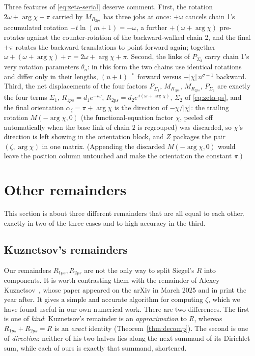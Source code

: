 \documentclass[11pt]{article}
\theoremstyle{definition}
\begin{document}
Three features of \eqref{eq:zeta-serial}
deserve comment. First, the rotation $2\omega+\arg\chi+\pi$ carried by
$M_{R_{2ps}}$ has three jobs at once: $+\omega$ cancels chain 1's
accumulated rotation $-t\ln(m+1)=-\omega$, a
further $+(\omega+\arg\chi)$ pre-rotates against the counter-rotation of
the backward-walked chain 2, and the final $+\pi$ rotates the backward
translations to point forward again; together
$\omega+(\omega+\arg\chi)+\pi=2\omega+\arg\chi+\pi$. Second, the links of
$P_{\Sigma_2}$ carry chain 1's very rotation parameters $\theta_n$:
in this form the two chains use identical rotations and differ only in
their lengths, $(n+1)^{-\sigma}$ forward versus $-|\chi|\,n^{\sigma-1}$
backward. Third, the net displacements of the four factors $P_{\Sigma_1}$,
$M_{R_{1ps}}$, $M_{R_{2ps}}$, $P_{\Sigma_2}$ are exactly the four terms
$\Sigma_1$, $R_{1ps}=d_1e^{-i\omega}$,
$R_{2ps}=d_2e^{\,i(\omega+\arg\chi)}$, $\Sigma_2$ of \eqref{eq:zeta-ps},
and the final orientation $\alpha_{\zeta}=\pi+\arg\chi$ is the direction of
$-\chi/|\chi|$: the trailing rotation $M(-\arg\chi,0)$ (the
functional-equation factor $\chi$, peeled off automatically when the base
link of chain 2 is regrouped) was discarded, so $\chi$'s direction is
left showing in the orientation block, and $Z$ packages the pair
$(\zeta,\arg\chi)$ in one matrix. (Appending the discarded
$M(-\arg\chi,0)$ would leave the position column untouched and make the
orientation the constant $\pi$.)

\section{Other remainders}\label{sec:other-remainders}

This section is about three different remainders that are all equal to each
other, exactly in two of the three cases and to high accuracy in the third.

\subsection{Kuznetsov's remainders}\label{sec:kuznetsov}

Our remainders $R_{1ps},R_{2ps}$ are not the only way to split Siegel's $R$ into components. It
is worth contrasting them with the remainder of Alexey
Kuznetsov~\cite{Kuznetsov2025}, whose paper appeared on the arXiv in March 2025
and in print the year after. It gives a simple and accurate algorithm for
computing $\zeta$, which we have found useful in our own numerical work.
There are two differences. The first is one of \emph{kind}: Kuznetsov's
remainder is an \emph{approximation} to $R$, whereas $R_{1ps}+R_{2ps}=R$ is an
\emph{exact} identity (Theorem~\ref{thm:decomp}). The second is one of
\emph{direction}: neither of his two halves lies along the next summand of its
Dirichlet sum, while each of ours is exactly that summand, shortened.
\end{document}
